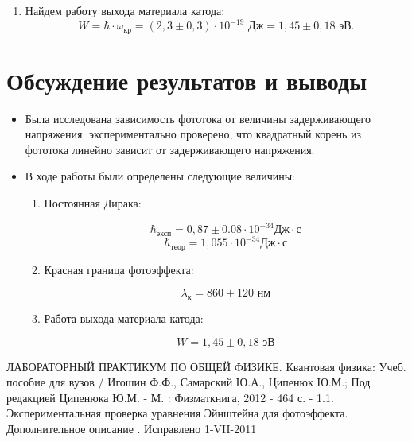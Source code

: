 \documentclass[a4paper,12pt]{article}
\begin{document}
\begin{enumerate}
\item Найдем работу выхода материала катода:
\begin{equation*}
    W = \hbar\cdot \omega_{кр} = (2,3\pm 0,3)\cdot 10^{-19}\text{ Дж} = 1,45 \pm 0,18 \text{ эВ}.
\end{equation*}

\end{enumerate}

\section{Обсуждение результатов и выводы}
\begin{itemize}



 \item Была исследована зависимость фототока от величины задерживающего напряжения: экспериментально проверено,  что квадратный корень из фототока линейно зависит от задерживающего напряжения.

 \item В ходе работы были определены следующие величины:
 
 \begin{enumerate}
     \item  Постоянная Дирака:

\[\hbar_\text{эксп} = 0,87 \pm 0.08 \cdot 10^{-34}\text{Дж}\cdot \text{с}\]
\[\hbar_\text{теор} = 1,055\cdot 10^{-34} \text{Дж}\cdot \text{с}\]

    \item Красная граница фотоэффекта:

\[\lambda_\text{к} = 860 \pm 120\text{ нм}\] 

    \item Работа выхода материала катода:

    \[W = 1,45 \pm 0,18 \text{ эВ}\]
\end{enumerate}
\end{itemize}
\newpage


\begin{thebibliography}{}
      ЛАБОРАТОРНЫЙ ПРАКТИКУМ ПО ОБЩЕЙ ФИЗИКЕ. Квантовая физика: Учеб. пособие для вузов / Игошин Ф.Ф., Самарский Ю.А., Ципенюк Ю.М.; Под редакцией Ципенюка Ю.М. - М. : Физматкнига, 2012 - 464 с. - 
      1.1. Экспериментальная проверка уравнения Эйнштейна для фотоэффекта. Дополнительное описание . Исправлено 1-VII-2011
\end{thebibliography}
\end{document}

